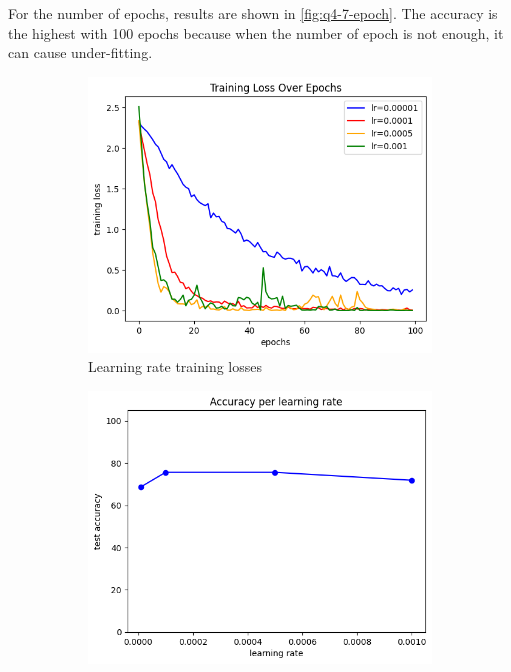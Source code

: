 For the number of epochs, results are shown in \cref{fig:q4-7-epoch}. The accuracy is the highest with 100 epochs because when the number of epoch is not enough, it can cause under-fitting.

\begin{figure}
	\centering
	\begin{subfigure}{0.23\linewidth}
		\centering
		\includegraphics[width=\linewidth]{image/q4-7-lr-train.png}
		\caption{Learning rate training losses}
		\label{fig:q4-7-lr-train}
	\end{subfigure}%
	\hfill
	\begin{subfigure}{0.23\linewidth}
		\centering
		\includegraphics[width=\linewidth]{image/q4-7-lr.png}

\end{subfigure}
\end{figure}
